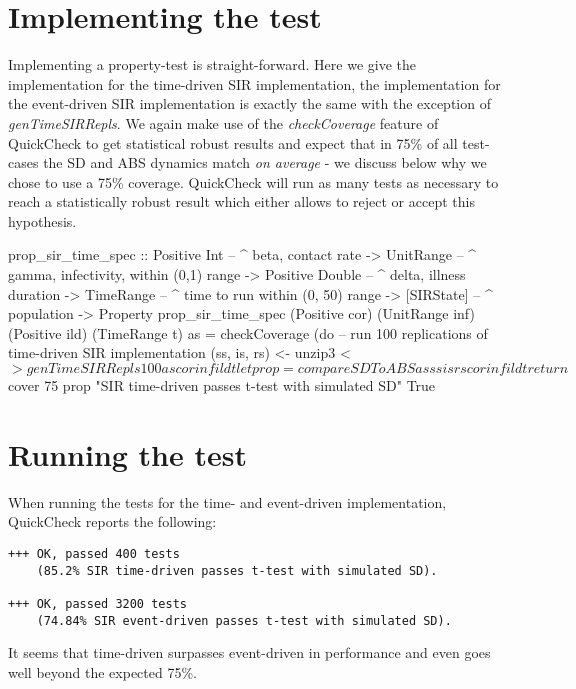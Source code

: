 \section{Implementing the test}
Implementing a property-test is straight-forward. Here we give the implementation for the time-driven SIR implementation, the implementation for the event-driven SIR implementation is exactly the same with the exception of \textit{genTimeSIRRepls}. We again make use of the \textit{checkCoverage} feature of QuickCheck to get statistical robust results and expect that in 75\% of all test-cases the SD and ABS dynamics match \textit{on average} - we discuss below why we chose to use a 75\% coverage. QuickCheck will run as many tests as necessary to reach a statistically robust result which either allows to reject or accept this hypothesis.

\begin{HaskellCode}
prop_sir_time_spec :: Positive Int    -- ^ beta, contact rate
                   -> UnitRange       -- ^ gamma, infectivity, within (0,1) range
                   -> Positive Double -- ^ delta, illness duration
                   -> TimeRange       -- ^ time to run within (0, 50) range
                   -> [SIRState]      -- ^ population
                   -> Property
prop_sir_time_spec 
    (Positive cor) (UnitRange inf) (Positive ild) (TimeRange t) as = checkCoverage (do
  -- run 100 replications of time-driven SIR implementation
  (ss, is, rs) <- unzip3 <$> genTimeSIRRepls 100 as cor inf ild t
  let prop = compareSDToABS as ss is rs cor inf ild t
  return $ cover 75 prop "SIR time-driven passes t-test with simulated SD" True
\end{HaskellCode}

\section{Running the test}
When running the tests for the time- and event-driven implementation, QuickCheck reports the following:

\begin{verbatim}
+++ OK, passed 400 tests 
    (85.2% SIR time-driven passes t-test with simulated SD).

+++ OK, passed 3200 tests 
    (74.84% SIR event-driven passes t-test with simulated SD).
\end{verbatim}

It seems that time-driven surpasses event-driven in performance and even goes well beyond the expected 75\%.

